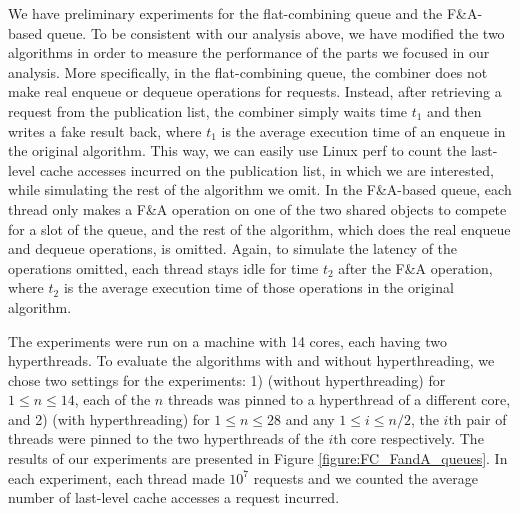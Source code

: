 We have preliminary experiments for the flat-combining queue and the F\&A-based queue. 
To be consistent with our analysis above, we have modified the two algorithms in order to 
measure the performance of the parts we focused in our analysis.  
More specifically, in the flat-combining queue, the combiner does not make 
real enqueue or dequeue operations for requests. 
Instead, after retrieving a request from the publication list, 
the combiner simply waits time $t_1$ and then writes a fake result back, 
where $t_1$ is the average execution time of an enqueue in the original algorithm. 
This way, we can easily use Linux perf to count the last-level cache accesses incurred 
on the publication list, in which we are interested, 
while simulating the rest of the algorithm we omit. 
In the F\&A-based queue, each thread only makes a F\&A operation on one of the two shared objects 
to compete for a slot of the queue, and the rest of the algorithm, 
which does the real enqueue and dequeue operations, is omitted. 
Again, to simulate the latency of the operations omitted, each thread stays idle for time $t_2$ 
after the F\&A operation, where $t_2$ is the average execution time of those operations 
in the original algorithm.

The experiments were run on a machine with 14 cores, each having two hyperthreads. 
To evaluate the algorithms with and without hyperthreading, we chose two settings for the experiments: 
1) (without hyperthreading) for $1 \le n \le 14$, 
each of the $n$ threads was pinned to a hyperthread of a different core, and
2) (with hyperthreading) for $1 \le n \le 28$ and any $1\le i \le n/2$, 
the $i$th pair of threads were pinned to the two hyperthreads of the $i$th core respectively. 
The results of our experiments are presented in Figure \ref{figure:FC_FandA_queues}. 
In each experiment, each thread made $10^7$ requests and 
we counted the average number of last-level cache accesses a request incurred. 

